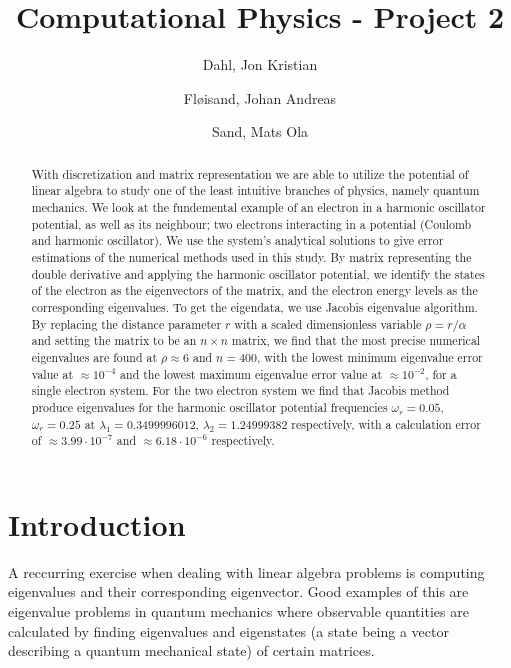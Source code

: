 \documentclass{emulateapj}
\begin{document}
\title{Computational Physics - Project 2}

\author{
  Dahl, Jon Kristian \\
  \and
  Fløisand, Johan Andreas \\
  \and
  Sand, Mats Ola \\
}

\begin{abstract}
With discretization and matrix representation we are able to utilize the potential of linear algebra to study one of the least intuitive branches of physics, namely quantum mechanics. We look at the fundemental example of an electron in a harmonic oscillator potential, as well as its neighbour; two electrons interacting in a potential (Coulomb and harmonic oscillator). We use the system's analytical solutions to give error estimations of the numerical methods used in this study. By matrix representing the double derivative and applying the harmonic oscillator potential, we identify the states of the electron as the eigenvectors of the matrix, and the electron energy levels as the corresponding eigenvalues. To get the eigendata, we use Jacobis eigenvalue algorithm. By replacing the distance parameter $r$ with a scaled dimensionless variable $\rho = r/\alpha$ and setting the matrix to be an $n \times n$ matrix, we find that the most precise numerical eigenvalues are found at $\rho \approx 6$ and $n = 400$, with the lowest minimum eigenvalue error value at $\approx 10^{-4}$ and the lowest maximum eigenvalue error value at $\approx 10^{-2}$, for a single electron system. For the two electron system we find that Jacobis method produce eigenvalues for the harmonic oscillator potential frequencies $\omega_r = 0.05$, $\omega_r = 0.25$ at $\lambda_1 = 0.3499996012$, $\lambda_2 = 1.24999382$ respectively, with a calculation error of $\approx 3.99 \cdot 10^{-7}$ and $\approx 6.18 \cdot 10^{-6}$ respectively.
\end{abstract}
\section{\textbf{Introduction}}
    A reccurring exercise when dealing with linear algebra problems is computing eigenvalues and their corresponding eigenvector. Good examples of this are eigenvalue problems in quantum mechanics where observable quantities are calculated by finding eigenvalues and eigenstates (a state being a vector describing a quantum mechanical state) of certain matrices.
    
\end{document}
